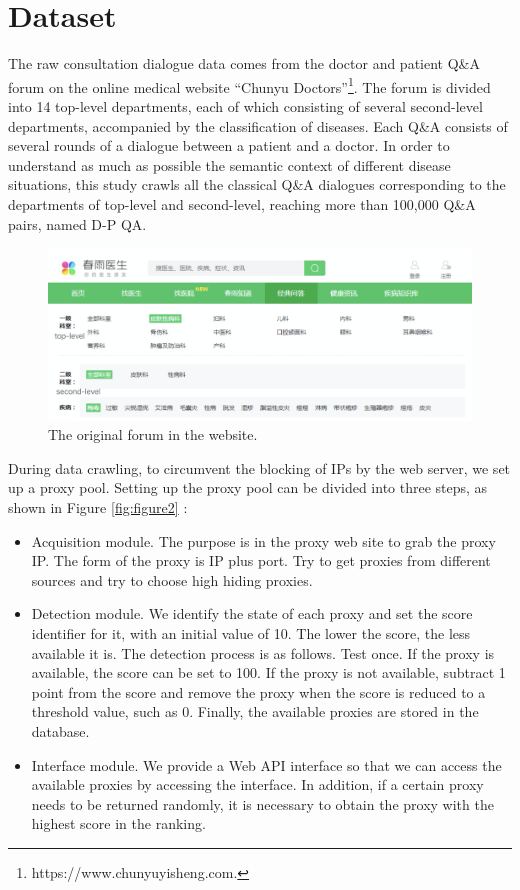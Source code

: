 \section{Dataset}
\label{dataset}

The raw consultation dialogue data comes from the doctor and patient Q\&A 
forum on the online medical website ``Chunyu Doctors''\footnote{https://www.chunyuyisheng.com.}. 
The forum is divided into 14 top-level departments, 
each of which consisting of several second-level departments, 
accompanied by the classification of diseases. 
Each Q\&A consists of several rounds of a dialogue between a patient and a doctor. In order to understand as much as possible the semantic context of different disease situations, this study crawls all the classical Q\&A dialogues corresponding to the departments of top-level and second-level, reaching more than 100,000 Q\&A pairs, named D-P QA.

\begin{figure}[h]
\centering
\includegraphics[scale=0.3]{2.png}
\caption{The original forum in the website.}
\label{fig:figure1}
\end{figure}

During data crawling, to circumvent the blocking of IPs by the web server, 
we set up a proxy pool. 
Setting up the proxy pool can be divided into three steps, as shown in Figure \ref{fig:figure2} : 
\begin{itemize}
\item[(1)]Acquisition module. The purpose is in the proxy web site to grab the proxy IP. The form of the proxy is IP plus port. Try to get proxies from different sources and try to choose high hiding proxies. 
\item[(2)]Detection module. We identify the state of each proxy and set the score identifier for it, with an initial value of 10. The lower the score, the less available it is. The detection process is as follows. Test once. If the proxy is available, the score can be set to 100. If the proxy is not available, subtract 1 point from the score and remove the proxy when the score is reduced to a threshold value, such as 0. Finally, the available proxies are stored in the database.
\item[(3)]Interface module. We provide a Web API interface so that we can access the available proxies by accessing the interface. In addition, if a certain proxy needs to be returned randomly, it is necessary to obtain the proxy with the highest score in the ranking.
\end{itemize}


